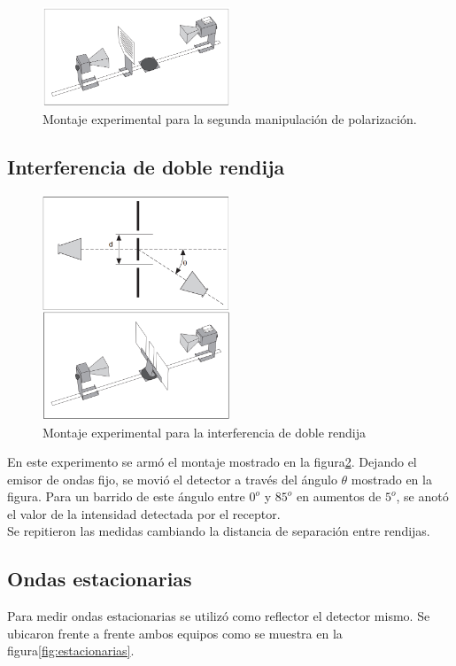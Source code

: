 \documentclass[prb,aps,twocolumn,preprintnumbers,amsmath,amssymb]{revtex4}
\begin{document}
\begin{figure}[h!]
\centering
\includegraphics[width=0.5\textwidth]{polarizer2}
\caption{Montaje experimental para la segunda manipulación de polarización.}
\label{fig:polarizador2}
\end{figure}

\subsection{Interferencia de doble rendija}

\begin{figure}[h!]
\centering
\includegraphics[width=0.5\textwidth]{doubleslit}
\caption{Montaje experimental para la interferencia de doble rendija}
\label{fig:Interferencia}
\end{figure}

En este experimento se armó el montaje mostrado en la figura\footnotemark[6] \ref{fig:Interferencia}. Dejando el emisor de ondas fijo, se movió el detector a través del ángulo $ \theta $ mostrado en la figura. Para un barrido de este ángulo entre $0^o$ y $85^o$ en aumentos de $5^o$, se anotó el valor de la intensidad detectada por el receptor. \\

Se repitieron las medidas cambiando la distancia de separación entre rendijas.

\subsection{Ondas estacionarias} 
Para medir ondas estacionarias se utilizó como reflector el detector mismo. Se ubicaron frente a frente ambos equipos como se muestra en la figura\footnotemark[6] \ref{fig:estacionarias}. \\
\end{document}
